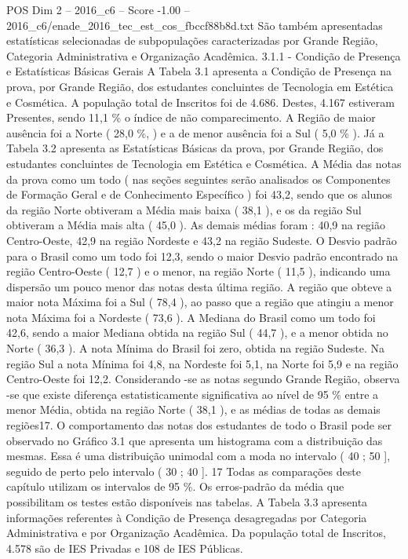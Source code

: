 \begin{textsample}{POS Dim 2 – 2016\_c6 – Score -1.00 – 2016\_c6/enade\_2016\_tec\_est\_cos\_fbccf88b8d.txt}
São também apresentadas estatísticas selecionadas de subpopulações caracterizadas por Grande Região, Categoria Administrativa e Organização Acadêmica. 3.1.1 - Condição de Presença e Estatísticas Básicas Gerais A Tabela 3.1 apresenta a Condição de Presença na prova, por Grande Região, dos estudantes concluintes de Tecnologia em Estética e Cosmética.
A população total de Inscritos foi de 4.686.
Destes, 4.167 estiveram Presentes, sendo 11,1 \% o índice de não comparecimento.
A Região de maior ausência foi a Norte ( 28,0 \%, ) e a de menor ausência foi a Sul ( 5,0 \% ).
Já a Tabela 3.2 apresenta as Estatísticas Básicas da prova, por Grande Região, dos estudantes concluintes de Tecnologia em Estética e Cosmética.
A Média das notas da prova como um todo ( nas seções seguintes serão analisados os Componentes de Formação Geral e de Conhecimento Específico ) foi 43,2, sendo que os alunos da região Norte obtiveram a Média mais baixa ( 38,1 ), e os da região Sul obtiveram a Média mais alta ( 45,0 ).
As demais médias foram : 40,9 na região Centro-Oeste, 42,9 na região Nordeste e 43,2 na região Sudeste.
O Desvio padrão para o Brasil como um todo foi 12,3, sendo o maior Desvio padrão encontrado na região Centro-Oeste ( 12,7 ) e o menor, na região Norte ( 11,5 ), indicando uma dispersão um pouco menor das notas desta última região.
A região que obteve a maior nota Máxima foi a Sul ( 78,4 ), ao passo que a região que atingiu a menor nota Máxima foi a Nordeste ( 73,6 ).
A Mediana do Brasil como um todo foi 42,6, sendo a maior Mediana obtida na região Sul ( 44,7 ), e a menor obtida no Norte ( 36,3 ).
A nota Mínima do Brasil foi zero, obtida na região Sudeste.
Na região Sul a nota Mínima foi 4,8, na Nordeste foi 5,1, na Norte foi 5,9 e na região Centro-Oeste foi 12,2.
Considerando -se as notas segundo Grande Região, observa -se que existe diferença estatisticamente significativa ao nível de 95 \% entre a menor Média, obtida na região Norte ( 38,1 ), e as médias de todas as demais regiões17.
O comportamento das notas dos estudantes de todo o Brasil pode ser observado no Gráfico 3.1 que apresenta um histograma com a distribuição das mesmas.
Essa é uma distribuição unimodal com a moda no intervalo ( 40 ; 50 ], seguido de perto pelo intervalo ( 30 ; 40 ]. 17 Todas as comparações deste capítulo utilizam os intervalos de 95 \%.
Os erros-padrão da média que possibilitam os testes estão disponíveis nas tabelas.
A Tabela 3.3 apresenta informações referentes à Condição de Presença desagregadas por Categoria Administrativa e por Organização Acadêmica.
Da população total de Inscritos, 4.578 são de IES Privadas e 108 de IES Públicas.

\end{textsample}
